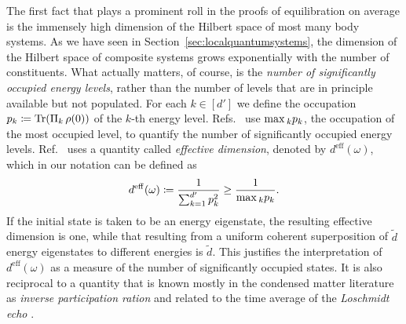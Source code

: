 \documentclass[a4paper,12pt,listof=totoc,index=totoc,bibliography=totoc,headsepline=false,headings=normal,BCOR16.153846mm,DIV12,headinclude,twoside,cleardoublepage=empty,numbers=noenddot,final]{scrreprt}
\theoremstyle{mystyle}
\numberwithin{equation}{section}
\numberwithin{figure}{section}
\numberwithin{lemma}{section}
\numberwithin{theorem}{section}
\numberwithin{corollary}{section}
\numberwithin{definition}{section}
\numberwithin{conjecture}{section}
\numberwithin{observation}{section}
\newcommand{\+}{\mkern2mu}
\newcommand{\coloneqq}{\mathrel{\vcentcolon\mkern-1.2mu=}} %
\renewcommand{\max}{\mathchoice{\operatorname*{max}}{\operatorname*{max}}{\mathrm{max}}{\mathrm{max}}} %
\newcommand{\deff}{d^{\mathrm{eff}}}
\DeclareMathOperator{\1}{\mathds{1}}
\DeclareMathOperator{\Tr}{Tr}
\begin{document}
The first fact that plays a prominent roll in the proofs of equilibration on average is the immensely high dimension of the Hilbert space of most many body systems.
As we have seen in Section~\ref{sec:localquantumsystems}, the dimension of the Hilbert space of composite systems grows exponentially with the number of constituents. 
What actually matters, of course, is the \emph{number of significantly occupied energy levels}, rather than the number of levels that are in principle available but not populated.
For each $k \in [d']$ we define the occupation $p_k \coloneqq \Tr(\Pi_k\,\rho(0))$ of the $k$-th energy level.
Refs.~\cite{tasaki98,Reimann08} use $\max_k p_k$, the occupation of the most occupied level, to quantify the number of significantly occupied energy levels.
Ref.~\cite{Linden09} uses a quantity called \emph{effective dimension}, denoted by $\deff(\omega)$, which in our notation can be defined as
\begin{equation} \label{eq:effectivedimension}
  \deff(\omega) \coloneqq \frac{1}{\sum_{k=1}^{d'} p_k^2} \geq \frac{1}{\max_k p_k} .
\end{equation}
If the initial state is taken to be an energy eigenstate, the resulting effective dimension is one, while that resulting from a uniform coherent superposition of $\tilde{d}$ energy eigenstates to different energies is $\tilde{d}$.
This justifies the interpretation of $\deff(\omega)$ as a measure of the number of significantly occupied states.
It is also reciprocal to a quantity that is known mostly in the condensed matter literature as \emph{inverse participation ration} \cite{Neuenhahn10} and related to the time average of the \emph{Loschmidt echo} \cite{Levstein98,Campos10}.
\end{document}
